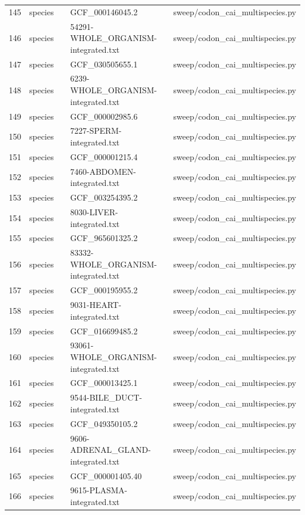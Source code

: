 {\begin{longtable}{rllp{3.2cm}p{4.2cm}}
145 & species &  & GCF\_000146045.2 & sweep/codon\_cai\_multispecies.py\\
146 & species &  & 54291-WHOLE\_ORGANISM-integrated.txt & sweep/codon\_cai\_multispecies.py\\
147 & species &  & GCF\_030505655.1 & sweep/codon\_cai\_multispecies.py\\
148 & species &  & 6239-WHOLE\_ORGANISM-integrated.txt & sweep/codon\_cai\_multispecies.py\\
149 & species &  & GCF\_000002985.6 & sweep/codon\_cai\_multispecies.py\\
150 & species &  & 7227-SPERM-integrated.txt & sweep/codon\_cai\_multispecies.py\\
151 & species &  & GCF\_000001215.4 & sweep/codon\_cai\_multispecies.py\\
152 & species &  & 7460-ABDOMEN-integrated.txt & sweep/codon\_cai\_multispecies.py\\
153 & species &  & GCF\_003254395.2 & sweep/codon\_cai\_multispecies.py\\
154 & species &  & 8030-LIVER-integrated.txt & sweep/codon\_cai\_multispecies.py\\
155 & species &  & GCF\_965601325.2 & sweep/codon\_cai\_multispecies.py\\
156 & species &  & 83332-WHOLE\_ORGANISM-integrated.txt & sweep/codon\_cai\_multispecies.py\\
157 & species &  & GCF\_000195955.2 & sweep/codon\_cai\_multispecies.py\\
158 & species &  & 9031-HEART-integrated.txt & sweep/codon\_cai\_multispecies.py\\
159 & species &  & GCF\_016699485.2 & sweep/codon\_cai\_multispecies.py\\
160 & species &  & 93061-WHOLE\_ORGANISM-integrated.txt & sweep/codon\_cai\_multispecies.py\\
161 & species &  & GCF\_000013425.1 & sweep/codon\_cai\_multispecies.py\\
162 & species &  & 9544-BILE\_DUCT-integrated.txt & sweep/codon\_cai\_multispecies.py\\
163 & species &  & GCF\_049350105.2 & sweep/codon\_cai\_multispecies.py\\
164 & species &  & 9606-ADRENAL\_GLAND-integrated.txt & sweep/codon\_cai\_multispecies.py\\
165 & species &  & GCF\_000001405.40 & sweep/codon\_cai\_multispecies.py\\
166 & species &  & 9615-PLASMA-integrated.txt & sweep/codon\_cai\_multispecies.py\\

\end{longtable}}

